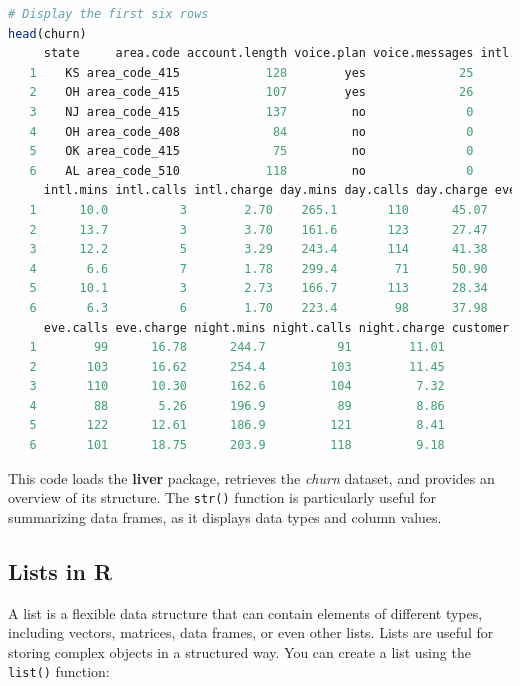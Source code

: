 \documentclass[
]{book}
\newcommand{\passthrough}[1]{#1}
\theoremstyle{definition}
\theoremstyle{definition}
\theoremstyle{definition}
\theoremstyle{definition}
\theoremstyle{remark}
\begin{document}
\begin{lstlisting}[language=R]
# Display the first six rows
head(churn)
     state     area.code account.length voice.plan voice.messages intl.plan
   1    KS area_code_415            128        yes             25        no
   2    OH area_code_415            107        yes             26        no
   3    NJ area_code_415            137         no              0        no
   4    OH area_code_408             84         no              0       yes
   5    OK area_code_415             75         no              0       yes
   6    AL area_code_510            118         no              0       yes
     intl.mins intl.calls intl.charge day.mins day.calls day.charge eve.mins
   1      10.0          3        2.70    265.1       110      45.07    197.4
   2      13.7          3        3.70    161.6       123      27.47    195.5
   3      12.2          5        3.29    243.4       114      41.38    121.2
   4       6.6          7        1.78    299.4        71      50.90     61.9
   5      10.1          3        2.73    166.7       113      28.34    148.3
   6       6.3          6        1.70    223.4        98      37.98    220.6
     eve.calls eve.charge night.mins night.calls night.charge customer.calls churn
   1        99      16.78      244.7          91        11.01              1    no
   2       103      16.62      254.4         103        11.45              1    no
   3       110      10.30      162.6         104         7.32              0    no
   4        88       5.26      196.9          89         8.86              2    no
   5       122      12.61      186.9         121         8.41              3    no
   6       101      18.75      203.9         118         9.18              0    no
\end{lstlisting}

This code loads the \textbf{liver} package, retrieves the \emph{churn} dataset, and provides an overview of its structure. The \passthrough{\lstinline!str()!} function is particularly useful for summarizing data frames, as it displays data types and column values.

\subsection*{Lists in R}\label{lists-in-r}

A list is a flexible data structure that can contain elements of different types, including vectors, matrices, data frames, or even other lists. Lists are useful for storing complex objects in a structured way. You can create a list using the \passthrough{\lstinline!list()!} function:
\end{document}
